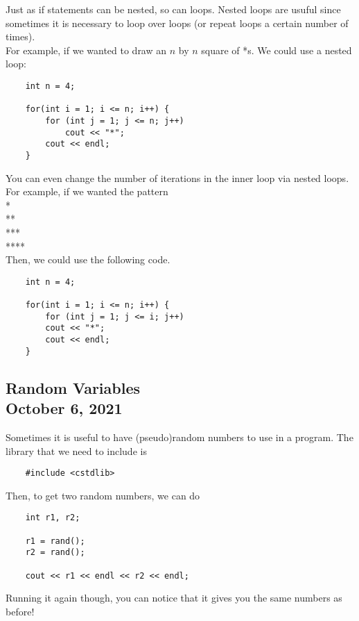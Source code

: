 \documentclass[]{article}
\begin{document}
Just as if statements can be nested, so can loops. Nested loops are usuful since sometimes it is necessary to loop over loops (or repeat loops a certain number of times).\\

For example, if we wanted to draw an $n$ by $n$ square of *s. We could use a nested loop:

\begin{lstlisting}
	int n = 4;
	
	for(int i = 1; i <= n; i++) {
		for (int j = 1; j <= n; j++)
			cout << "*";
		cout << endl;
	}
\end{lstlisting}

You can even change the number of iterations in the inner loop via nested loops. For example, if we wanted the pattern\\

*\\
**\\
***\\
****\\

Then, we could use the following code.

\begin{lstlisting}
	int n = 4;
	
	for(int i = 1; i <= n; i++) {
		for (int j = 1; j <= i; j++)
		cout << "*";
		cout << endl;
	}
\end{lstlisting}


\subsection{Random Variables\\ {\large \normalfont October 6, 2021}}
\bigbreak

Sometimes it is useful to have (pseudo)random numbers to use in a program. The library that we need to include is

\begin{lstlisting}
	#include <cstdlib>
\end{lstlisting}

Then, to get two random numbers, we can do

\begin{lstlisting}
	int r1, r2;
	 
	r1 = rand();
	r2 = rand();
	
	cout << r1 << endl << r2 << endl;
\end{lstlisting}

Running it again though, you can notice that it gives you the same numbers as before!\\
\end{document}
